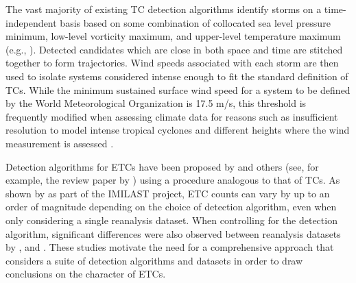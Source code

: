 \documentclass[11pt]{article}
\newcommand\citep{\cite}
\newcommand\citet{\cite}
\begin{document}

The vast majority of existing TC detection algorithms identify storms on a time-independent basis based on some combination of collocated sea level pressure minimum, low-level vorticity maximum, and upper-level temperature maximum (e.g., \citet{Vitart1997,Oouchi2006,Bengtsson2007a,Knutson2007,Walsh2007,Tory2013a,Zarzycki2014AMIPTCs}). Detected candidates which are close in both space and time are stitched together to form trajectories. Wind speeds associated with each storm are then used to isolate systems considered intense enough to fit the standard definition of TCs. While the minimum sustained surface wind speed for a system to be defined by the World Meteorological Organization is 17.5 m/s, this threshold is frequently modified when assessing climate data for reasons such as insufficient resolution to model intense tropical cyclones and different heights where the wind measurement is assessed \citep{Walsh2007}.

Detection algorithms for ETCs have been proposed by \cite{wang2006climatology, wernli2006surface, raible2008northern} and others (see, for example, the review paper by \cite{ulbrich2009extra}) using a procedure analogous to that of TCs.  As shown by \cite{neu2013imilast} as part of the IMILAST project, ETC counts can vary by up to an order of magnitude depending on the choice of detection algorithm, even when only considering a single reanalysis dataset.  When controlling for the detection algorithm, significant differences were also observed between reanalysis datasets by \cite{hodges2003comparison}, \cite{wang2006climatology} and \cite{raible2008northern}.  These studies motivate the need for a comprehensive approach that considers a suite of detection algorithms and datasets in order to draw conclusions on the character of ETCs.
\end{document}
